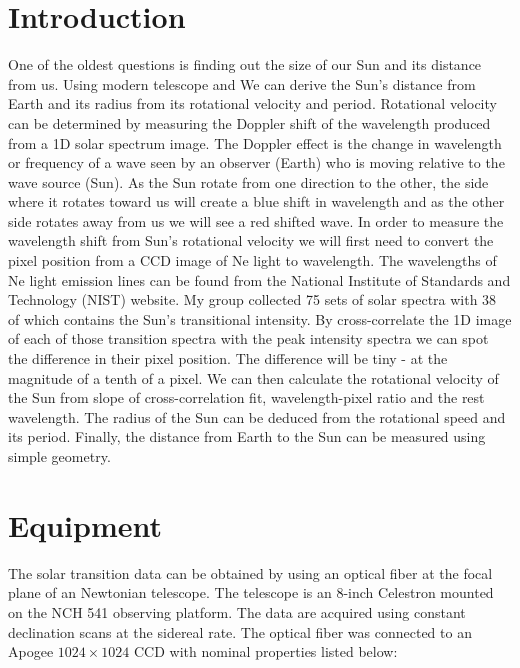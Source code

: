 \documentclass[onecolumn, 12pt, a4paper]{article}
\begin{document}
\section{Introduction}
One of the oldest questions is finding out the size of our Sun and its distance from us. Using modern telescope and  We can derive the Sun's distance from Earth and its radius from its rotational velocity and period. Rotational velocity can be determined by measuring the Doppler shift of the wavelength produced from a 1D solar spectrum image. The Doppler effect is the change in wavelength or frequency of a wave seen by an observer (Earth) who is moving relative to the wave source (Sun). As the Sun rotate from one direction to the other, the side where it rotates toward us will create a blue shift in wavelength and as the other side rotates away from us we will see a red shifted wave. In order to measure the wavelength shift from Sun's rotational velocity we will first need to convert the pixel position from a CCD image of Ne light to wavelength. The wavelengths of Ne light emission lines can be found from the National Institute of Standards and Technology (NIST) website. My group collected 75 sets of solar spectra with 38 of which contains the Sun's transitional intensity. By cross-correlate the 1D image of each of those transition spectra with the peak intensity spectra we can spot the difference in their pixel position. The difference will be tiny - at the magnitude of a tenth of a pixel. We can then calculate the rotational velocity of the Sun from slope of cross-correlation fit, wavelength-pixel ratio and the rest wavelength. The radius of the Sun can be deduced from the rotational speed and its period. Finally, the distance from Earth to the Sun can be measured using simple geometry. 

\section{Equipment}
The solar transition data can be obtained by using an optical fiber at the focal plane of an Newtonian telescope. The telescope is an 8-inch Celestron mounted on the NCH 541 observing platform. The data are acquired using constant declination scans at the sidereal rate. The optical fiber was connected to an Apogee $1024 \times 1024$ CCD with nominal properties listed below: \newline
\end{document}
